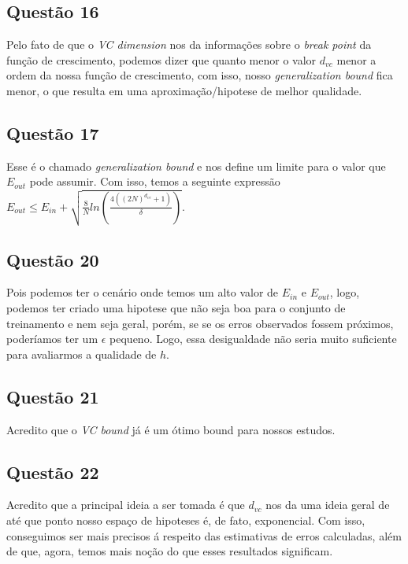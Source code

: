 \documentclass[12pt, a4paper]{article}
\begin{document}
\subsection*{Questão 16} {
    Pelo fato de que o \emph{VC dimension} nos da informações sobre o \emph{break point} da função de crescimento, podemos dizer que quanto menor o valor $ d_{vc} $ menor a ordem da nossa função de crescimento, com isso, nosso \emph{generalization bound} fica menor, o que resulta em uma aproximação/hipotese de melhor qualidade.
}

\subsection*{Questão 17} {
    Esse é o chamado \emph{generalization bound} e nos define um limite para o valor que $ E_{out} $ pode assumir. Com isso, temos a seguinte expressão $ E_{out} \le E_{in} + \sqrt{ \frac{8}{N} ln(\frac{ 4((2N)^{d_{vc}}+1) }{\delta})} $.
}



\subsection*{Questão 20} {
    Pois podemos ter o cenário onde temos um alto valor de $ E_{in} $ e $ E_{out} $, logo, podemos ter criado uma hipotese que não seja boa para o conjunto de treinamento e nem seja geral, porém, se se os erros observados fossem próximos, poderíamos ter um $\epsilon$ pequeno. Logo, essa desigualdade não seria muito suficiente para avaliarmos a qualidade de $h$.
}

\subsection*{Questão 21} {
    Acredito que o \emph{VC bound} já é um ótimo bound para nossos estudos. 
}

\subsection*{Questão 22} {
    Acredito que a principal ideia a ser tomada é que $ d_{vc} $ nos da uma ideia geral de até que ponto nosso espaço de hipoteses é, de fato, exponencial. Com isso, conseguimos ser mais precisos á respeito das estimativas de erros calculadas, além de que, agora, temos mais noção do que esses resultados significam.
}
\end{document}
